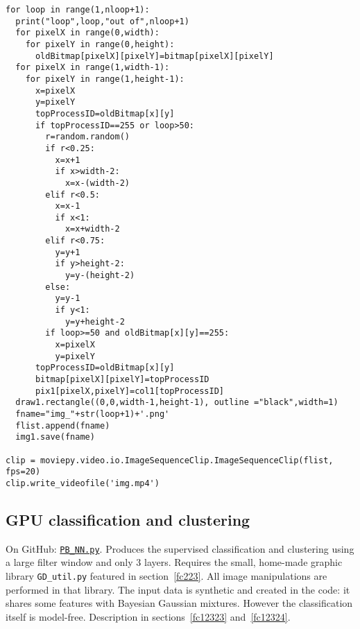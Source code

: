 \documentclass[oneside,10pt]{book}
\begin{document}
\begin{lstlisting}
for loop in range(1,nloop+1):
  print("loop",loop,"out of",nloop+1)
  for pixelX in range(0,width):
    for pixelY in range(0,height):
      oldBitmap[pixelX][pixelY]=bitmap[pixelX][pixelY]
  for pixelX in range(1,width-1):
    for pixelY in range(1,height-1):
      x=pixelX
      y=pixelY
      topProcessID=oldBitmap[x][y]
      if topProcessID==255 or loop>50:
        r=random.random()
        if r<0.25:
          x=x+1
          if x>width-2:
            x=x-(width-2)
        elif r<0.5:
          x=x-1
          if x<1:
            x=x+width-2
        elif r<0.75:
          y=y+1
          if y>height-2:
            y=y-(height-2)
        else:
          y=y-1
          if y<1:
            y=y+height-2
        if loop>=50 and oldBitmap[x][y]==255:
          x=pixelX
          y=pixelY
      topProcessID=oldBitmap[x][y]
      bitmap[pixelX][pixelY]=topProcessID
      pix1[pixelX,pixelY]=col1[topProcessID]
  draw1.rectangle((0,0,width-1,height-1), outline ="black",width=1)
  fname="img_"+str(loop+1)+'.png'
  flist.append(fname)
  img1.save(fname)

clip = moviepy.video.io.ImageSequenceClip.ImageSequenceClip(flist, fps=20)
clip.write_videofile('img.mp4')
\end{lstlisting}

\subsection{GPU classification and clustering}\label{fc222}

On GitHub: \href{https://github.com/VincentGranville/Point-Processes/blob/main/Source\%20Code/PB_NN.py}{\texttt{PB\_NN.py}}. Produces the supervised classification and clustering using a large filter window and only $3$ layers. Requires
 the small, home-made graphic library \texttt{GD\_util.py} featured in section~\ref{fc223}. All image manipulations are performed in that library. The input data is synthetic and created in the code: it shares some features with Bayesian Gaussian mixtures. However the classification itself is model-free. Description in sections~\ref{fc12323} and~\ref{fc12324}.
\end{document}
